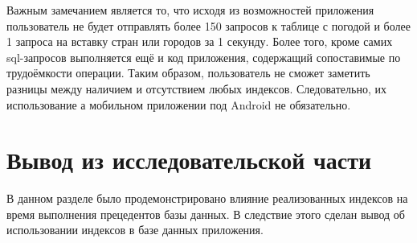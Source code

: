 Важным замечанием является то, что исходя из возможностей приложения пользователь не будет отправлять более 150 запросов к таблице с погодой и более 1 запроса на вставку стран или городов за 1 секунду.
Более того, кроме самих sql-запросов выполняется ещё и код приложения, содержащий сопоставимые по трудоёмкости операции.
Таким образом, пользователь не сможет заметить разницы между наличием и отсутствием любых индексов.
Следовательно, их использование а мобильном приложении под Android не обязательно.

\section*{Вывод из исследовательской части}
В данном разделе было продемонстрировано влияние реализованных индексов на время выполнения прецедентов базы данных.
В следствие этого сделан вывод об использовании индексов в базе данных приложения.